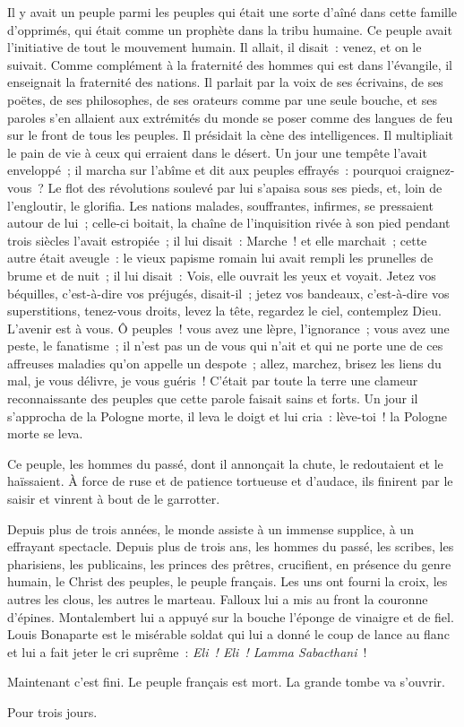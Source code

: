 \documentclass[french,twoside]{book} %
\begin{document}
Il y avait un peuple parmi les peuples qui était une sorte d’aîné dans cette famille d’opprimés, qui était comme un prophète dans la tribu humaine. Ce peuple avait l’initiative de tout le mouvement humain. Il allait, il disait : venez, et on le suivait. Comme complément à la fraternité des hommes qui est dans l’évangile, il enseignait la fraternité des nations. Il parlait par la voix de ses écrivains, de ses poëtes, de ses philosophes, de ses orateurs comme par une seule bouche, et ses paroles s’en allaient aux extrémités du monde se poser comme des langues de feu sur le front de tous les peuples. Il présidait la cène des intelligences. Il multipliait le pain de vie à ceux qui erraient dans le désert. Un jour une tempête l’avait enveloppé ; il marcha sur l’abîme et dit aux peuples effrayés : pourquoi craignez-vous ? Le flot des révolutions soulevé par lui s’apaisa sous ses pieds, et, loin de l’engloutir, le glorifia. Les nations malades, souffrantes, infirmes, se pressaient autour de lui ; celle-ci boitait, la chaîne de l’inquisition rivée à son pied pendant trois siècles l’avait estropiée ; il lui disait : Marche ! et elle marchait ; cette autre était aveugle : le vieux papisme romain lui avait rempli les prunelles de brume et de nuit ; il lui disait : Vois, elle ouvrait les yeux et voyait. Jetez vos béquilles, c’est-à-dire vos préjugés, disait-il ; jetez vos bandeaux, c’est-à-dire vos superstitions, tenez-vous droits, levez la tête, regardez le ciel, contemplez Dieu. L’avenir est à vous. Ô peuples ! vous avez une lèpre, l’ignorance ; vous avez une peste, le fanatisme ; il n’est pas un de vous qui n’ait et qui ne porte une de ces affreuses maladies qu’on appelle un despote ; allez, marchez, brisez les liens du mal, je vous délivre, je vous guéris ! C’était par toute la terre une clameur reconnaissante des peuples que cette parole faisait sains et forts. Un jour il s’approcha de la Pologne morte, il leva le doigt et lui cria : lève-toi ! la Pologne morte se leva.\par
Ce peuple, les hommes du passé, dont il annonçait la chute, le redoutaient et le haïssaient. À force de ruse et de patience tortueuse et d’audace, ils finirent par le saisir et vinrent à bout de le garrotter.\par
Depuis plus de trois années, le monde assiste à un immense supplice, à un effrayant spectacle. Depuis plus de trois ans, les hommes du passé, les scribes, les pharisiens, les publicains, les princes des prêtres, crucifient, en présence du genre humain, le Christ des peuples, le peuple français. Les uns ont fourni la croix, les autres les clous, les autres le marteau. Falloux lui a mis au front la couronne d’épines. Montalembert lui a appuyé sur la bouche l’éponge de vinaigre et de fiel. Louis Bonaparte est le misérable soldat qui lui a donné le coup de lance au flanc et lui a fait jeter le cri suprême : \emph{Eli ! Eli ! Lamma Sabacthani} !\par
Maintenant c’est fini. Le peuple français est mort. La grande tombe va s’ouvrir.\par
Pour trois jours.\par
\end{document}
